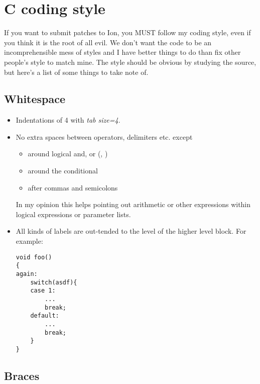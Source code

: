 \section{C coding style}

If you want to submit patches to Ion, you MUST follow my coding 
style, even if you think it is the root of all evil. We don't want
the code to be an incomprehensible mess of styles and I have better
things to do than fix other people's style to match mine. The style
should be obvious by studying the source, but here's a list of some
things to take note of.

\subsection{Whitespace}

\begin{itemize}
  \item Indentations of 4 with \emph{tab size=4}. 
    
  \item No extra spaces between operators, delimiters etc. except
    \begin{itemize}
      \item around logical and, or (\code{&&}, \code{||})
      \item around the conditional 
      \item after commas and semicolons
    \end{itemize}  
    In my opinion this helps pointing out arithmetic or other
    expressions within logical expressions or parameter lists.
    
  \item All kinds of labels are out-tended to the level of the higher
    level block. For example:

\begin{verbatim}    
void foo()
{
again:
    switch(asdf){
    case 1:
        ...
        break;
    default:
        ...
        break;
    }
}
\end{verbatim}
\end{itemize}

\subsection{Braces}

